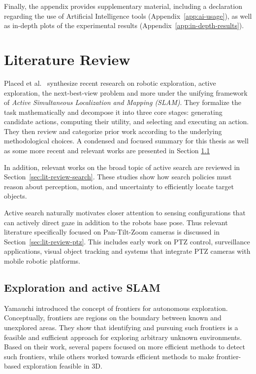 \documentclass[
	parspace, %
	noindent, %
	final, %
]{elteikthesis}
\begin{document}
Finally, the appendix provides supplementary material, including a declaration regarding the use of Artificial Intelligence tools (Appendix~\ref{app:ai-usage}), as well as in-depth plots of the experimental results (Appendix~\ref{app:in-depth-results}).

\chapter{Literature Review}
\label{ch:lit-review}

Placed et al.~\cite{survey_placed_2023} synthesize recent research on robotic exploration, active exploration, the next-best-view problem and more under the unifying framework of \textit{Active Simultaneous Localization and Mapping (SLAM)}. They formalize the task mathematically and decompose it into three core stages: generating candidate actions, computing their utility, and selecting and executing an action. They then review and categorize prior work according to the underlying methodological choices. A condensed and focused summary for this thesis as well as some more recent and relevant works are presented in Section \ref{sec:lit-review-slam}

In addition, relevant works on the broad topic of active search are reviewed in Section~\ref{sec:lit-review-search}. These studies show how search policies must reason about perception, motion, and uncertainty to efficiently locate target objects. 

Active search naturally motivates closer attention to sensing configurations that can actively direct gaze in addition to the robots base pose. Thus relevant literature specifically focused on Pan-Tilt-Zoom cameras is discussed in Section~\ref{sec:lit-review-ptz}. This includes early work on PTZ control, surveillance applications, visual object tracking and systems that integrate PTZ cameras with mobile robotic platforms.

\section{Exploration and active SLAM}
\label{sec:lit-review-slam}

Yamauchi \cite{frontierbased_yamauchi_1997} introduced the concept of frontiers for autonomous exploration. Conceptually, frontiers are regions on the boundary between known and unexplored areas. They show that identifying and pursuing such frontiers is a feasible and sufficient approach for exploring arbitrary unknown environments. Based on their work, several papers \cite{efficient_keidar_2014, approaches_quin_2021} focused on more efficient methods to detect such frontiers, while others \cite{multiresolution_batinovi_2021, frontierbased_deng_2020, autonomous_umari_2017, receding_bircher_2016} worked towards efficient methods to make frontier-based exploration feasible in 3D.
\end{document}
